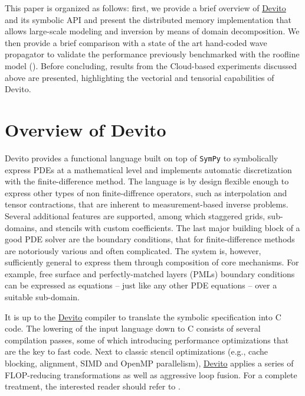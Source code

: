\documentclass[conference]{IEEEtran}
\begin{document}
This paper is organized as follows: first, we provide a brief overview
of \href{https://github.com/devitocodes/devito}{Devito} and its symbolic
API and present the distributed memory implementation that allows
large-scale modeling and inversion by means of domain decomposition. We
then provide a brief comparison with a state of the art hand-coded wave
propagator to validate the performance previously benchmarked with the
roofline model
(\cite{patterson, devito-compiler, devito-api, louboutin2016ppf}).
Before concluding, results from the Cloud-based experiments discussed
above are presented, highlighting the vectorial and tensorial
capabilities of Devito.

\section{Overview of Devito}\label{overview-of-devito}

Devito \cite{devito-api} provides a functional language built on top of
\texttt{SymPy} \cite{sympy} to symbolically express PDEs at a
mathematical level and implements automatic discretization with the
finite-difference method. The language is by design flexible enough to
express other types of non finite-diffrence operators, such as
interpolation and tensor contractions, that are inherent to
measurement-based inverse problems. Several additional features are
supported, among which staggered grids, sub-domains, and stencils with
custom coefficients. The last major building block of a good PDE solver
are the boundary conditions, that for finite-difference methods are
notoriously various and often complicated. The system is, however,
sufficiently general to express them through composition of core
mechanisms. For example, free surface and perfectly-matched layers
(PMLs) boundary conditions can be expressed as equations -- just like
any other PDE equations -- over a suitable sub-domain.

It is up to the \href{https://github.com/devitocodes/devito}{Devito}
compiler to translate the symbolic specification into C code. The
lowering of the input language down to C consists of several compilation
passes, some of which introducing performance optimizations that are the
key to fast code. Next to classic stencil optimizations (e.g., cache
blocking, alignment, SIMD and OpenMP parallelism),
\href{https://github.com/devitocodes/devito}{Devito} applies a series of
FLOP-reducing transformations as well as aggressive loop fusion. For a
complete treatment, the interested reader should refer to
\cite{devito-compiler}.
\end{document}
